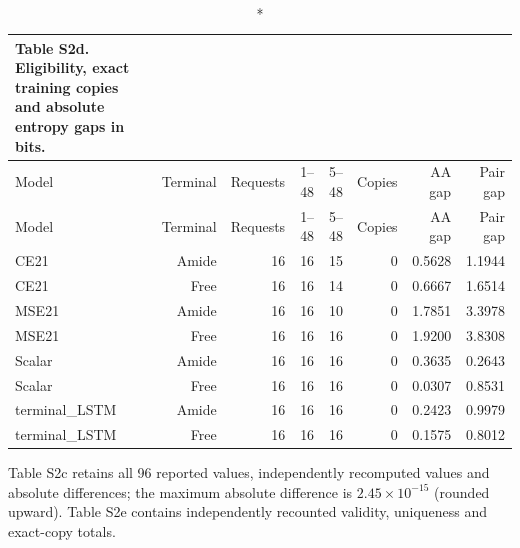 \begingroup\small\setlength{\tabcolsep}{4pt}\renewcommand{\arraystretch}{1.15}
\begin{longtable}{lrrrrrrr}
\caption*{\textbf{Table S2d.} Eligibility, exact training copies and absolute entropy gaps in bits.}\\
\toprule
Model & Terminal & Requests & 1--48 & 5--48 & Copies & AA gap & Pair gap \\
\midrule\endfirsthead
Model & Terminal & Requests & 1--48 & 5--48 & Copies & AA gap & Pair gap \\
\midrule\endhead
CE21 & Amide & 16 & 16 & 15 & 0 & 0.5628 & 1.1944 \\
CE21 & Free & 16 & 16 & 14 & 0 & 0.6667 & 1.6514 \\
MSE21 & Amide & 16 & 16 & 10 & 0 & 1.7851 & 3.3978 \\
MSE21 & Free & 16 & 16 & 16 & 0 & 1.9200 & 3.8308 \\
Scalar & Amide & 16 & 16 & 16 & 0 & 0.3635 & 0.2643 \\
Scalar & Free & 16 & 16 & 16 & 0 & 0.0307 & 0.8531 \\
terminal\_LSTM & Amide & 16 & 16 & 16 & 0 & 0.2423 & 0.9979 \\
terminal\_LSTM & Free & 16 & 16 & 16 & 0 & 0.1575 & 0.8012 \\
\bottomrule\end{longtable}\endgroup
\noindent Table S2c retains all 96 reported values, independently recomputed values and absolute differences; the maximum absolute difference is $2.45\times10^{-15}$ (rounded upward). Table S2e contains independently recounted validity, uniqueness and exact-copy totals.
